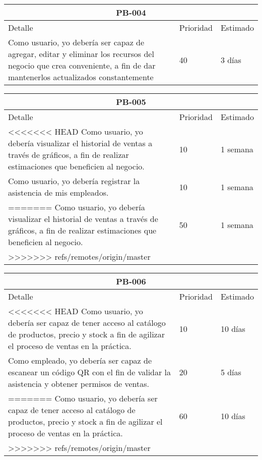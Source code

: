 \begin{table}[htbp]
	\begin{center}
		\begin{tabular}{|p{10cm} | p{2cm} | p{2cm}|}
			\hline
			\multicolumn{3}{|c|}{PB-004}\\
			\hline
			Detalle & Prioridad & Estimado \\
			\hline
			Como usuario, yo debería ser capaz de agregar, editar y eliminar los recursos del negocio que crea conveniente, a fin de dar mantenerlos actualizados constantemente& 40 & 3 días \\
			\hline	
		\end{tabular}
	\end{center}
\end{table}

\begin{table}[htbp]
	\begin{center}
		\begin{tabular}{|p{10cm} | p{2cm} | p{2cm}|}
			\hline
			\multicolumn{3}{|c|}{PB-005}\\
			\hline
			Detalle & Prioridad & Estimado \\
			\hline
<<<<<<< HEAD
			Como usuario, yo debería visualizar el historial de ventas a través de gráficos, a fin de realizar estimaciones que beneficien al negocio. & 10 & 1 semana \\
			\hline
			Como usuario, yo debería registrar la asistencia de mis empleados. & 10 & 1 semana \\
=======
			Como usuario, yo debería visualizar el historial de ventas a través de gráficos, a fin de realizar estimaciones que beneficien al negocio. & 50 & 1 semana \\
>>>>>>> refs/remotes/origin/master
			\hline	
		\end{tabular}
	\end{center}
\end{table}

\begin{table}[htbp]
	\begin{center}
		\begin{tabular}{|p{10cm} | p{2cm} | p{2cm}|}
			\hline
			\multicolumn{3}{|c|}{PB-006}\\
			\hline
			Detalle & Prioridad & Estimado \\
			\hline
<<<<<<< HEAD
			Como usuario, yo debería ser capaz de tener acceso al catálogo de productos, precio y stock a fin de agilizar el proceso de ventas en la práctica. & 10 & 10 días \\
			\hline
			Como empleado, yo debería ser capaz de escanear un código QR con el fin de validar la asistencia y obtener permisos de ventas. & 20 & 5 días \\
=======
			Como usuario, yo debería ser capaz de tener acceso al catálogo de productos, precio y stock a fin de agilizar el proceso de ventas en la práctica. & 60 & 10 días \\
>>>>>>> refs/remotes/origin/master
			\hline	
		\end{tabular}
	\end{center}
\end{table}

